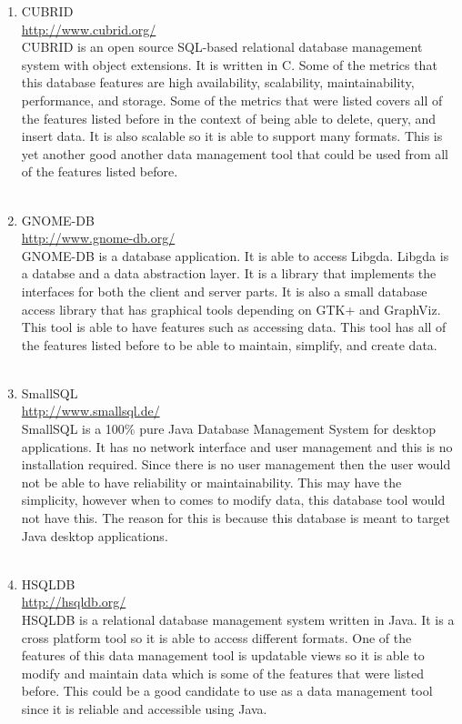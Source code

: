 \documentclass{article}
\begin{document}
\begin{enumerate}
\\
\\
\item CUBRID
\\
\url{http://www.cubrid.org/}
\\
CUBRID is an open source SQL-based relational database management system with object extensions. It is written in C. Some of the metrics that this database features are high availability, scalability, maintainability, performance, and storage. Some of the metrics that were listed covers all of the features listed before in the context of being able to delete, query, and insert data. It is also scalable so it is able to support many formats. This is yet another good another data management tool that could be used from all of the features listed before.
\\
\\
\item GNOME-DB
\\
\url{http://www.gnome-db.org/}
\\
GNOME-DB is a database application. It is able to access Libgda. Libgda is a databse and a data abstraction layer. It is a library that implements the interfaces for both the client and server parts. It is also a small database access library that has graphical tools depending on GTK+ and GraphViz. This tool is able to have features such as accessing data. This tool has all of the features listed before to be able to maintain, simplify, and create data. 
\\
\\
\item SmallSQL
\\
\url{http://www.smallsql.de/}
\\
SmallSQL is a 100\% pure Java Database Management System for desktop applications. It has no network interface and user management and this is no installation required. Since there is no user management then the user would not be able to have reliability or maintainability. This may have the simplicity, however when to comes to modify data, this database tool would not have this. The reason for this is because this database is meant to target Java desktop applications.
\\
\\
\item HSQLDB
\\
\url{http://hsqldb.org/}
\\
HSQLDB is a relational database management system written in Java. It is a cross platform tool so it is able to access different formats. One of the features of this data management tool is updatable views so it is able to modify and maintain data which is some of the features that were listed before. This could be a good candidate to use as a data management tool since it is reliable and accessible using Java.  

\end{enumerate}
\end{document}
